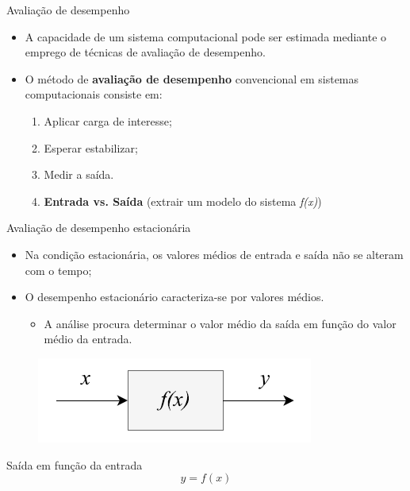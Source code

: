 \begin{frame}{Avaliação de desempenho}
	\begin{itemize}
		\item A capacidade de um sistema computacional pode ser estimada mediante o emprego de técnicas de avaliação de desempenho.
		
		\item O método de \textbf{avaliação de desempenho} convencional em sistemas computacionais consiste em: 
		\begin{enumerate}
			\item Aplicar carga de interesse;
			\item Esperar estabilizar;
			\item Medir a saída.  
			\item<2> \textbf{Entrada vs. Saída} (extrair um modelo do sistema \textit{f(x)})
		\end{enumerate}
	\end{itemize}
\end{frame}
	
\begin{frame}{Avaliação de desempenho estacionária}
	\begin{itemize}
		\item Na condição estacionária, os valores médios de entrada e saída não se alteram com o tempo; 
		\item O desempenho estacionário caracteriza-se por valores médios.  
		\begin{itemize}
			\item A análise procura determinar o valor médio da saída em função do valor médio da entrada.
		\end{itemize}
	\end{itemize}
	\begin{figure}
		\centering
		\includegraphics[scale=.6]{images/performance-1-pt.png}
		\label{fig:bloco-estacionario}
	\end{figure}
	\begin{block}{Saída em função da entrada}
		\begin{equation}
			y = f(x)
		\end{equation} 
	\end{block}
\end{frame}


